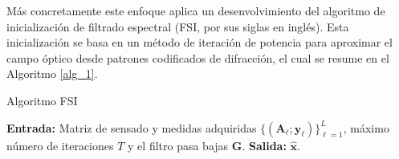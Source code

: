 

Más concretamente este enfoque aplica un desenvolvimiento del algoritmo de inicialización de filtrado espectral (FSI, por sus siglas en inglés). Esta inicialización se basa en un método de iteración de potencia para aproximar el campo óptico desde patrones codificados de difracción, el cual se resume en el Algoritmo \ref{alg_1}.

\begin{algorithm}[!h]
    \caption{Algoritmo FSI}%
    \textbf{Entrada:} Matriz de sensado y medidas adquiridas $\{(\mathbf{A}_\ell;\mathbf{y}_\ell)\}_{\ell=1}^L$, máximo número de iteraciones $T$ y el filtro pasa bajas $ \mathbf{G}$.\newline
    \textbf{Salida:} $\hat{\mathbf{x}}$.
    \begin{algorithmic}[1]
        
        \EndFor
    \end{algorithmic}
    \label{alg_1}
\end{algorithm}

